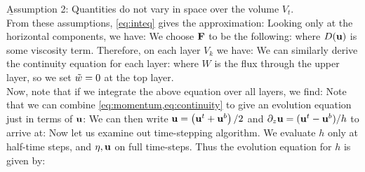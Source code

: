 \documentclass[10pt]{article}
\begin{document}
\b{Assumption 2}: Quantities do not vary in space over the volume $V_{t}$.\\
From these assumptions, \cref{eq:inteq} gives the approximation:
Looking only at the horizontal components, we have:
We choose $\mathbf{F}$ to be the following:
where $D(\mathbf{u})$ is some viscosity term. Therefore, on each layer $V_{k}$ we have:
We can similarly derive the continuity equation for each layer:
where $W$ is the flux through the upper layer, so we set $\tilde{w} = 0$ at the top layer. \\
\linebreak
Now, note that if we integrate the above equation over all layers, we find:
Note that we can combine \cref{eq:momentum,eq:continuity} to give an evolution equation just in terms of $\textbf{u}$:
We can then write $\mathbf{u} = \left(\mathbf{u}^{t} + \mathbf{u}^{b}\right)/2$ and $\partial_{z}\mathbf{u} = (\mathbf{u}^{t} - \mathbf{u}^{b})/h$ to arrive at:
Now let us examine out time-stepping algorithm. We evaluate $h$ only at half-time steps, and $\eta,\mathbf{u}$ on full time-steps. Thus the evolution equation for $h$ is given by:
\end{document}
